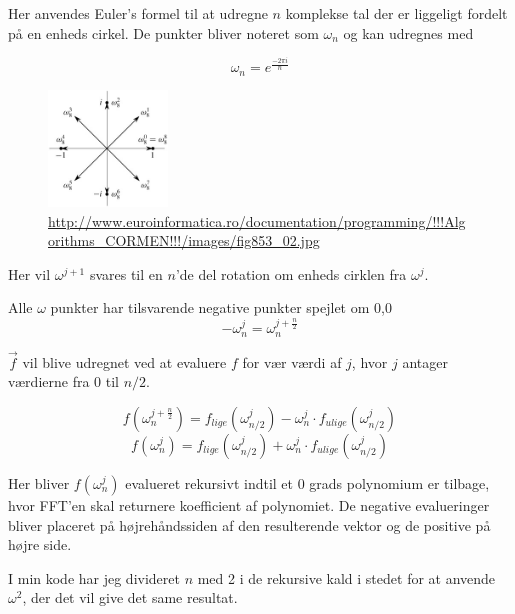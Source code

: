 \documentclass[11pt,a4paper]{article}
\begin{document}
Her anvendes Euler's formel til at udregne \(n\) komplekse tal der er liggeligt fordelt på en enheds cirkel.
De punkter bliver noteret som \(\omega_n\) og kan udregnes med

$$
\omega_n = e^{\frac{-2\pi i}{n}}
$$

\begin{figure}[htbp]
\centering
\includegraphics[width=120]{./nth_root_of_unity.jpg}
\caption{\url{http://www.euroinformatica.ro/documentation/programming/!!!Algorithms\_CORMEN!!!/images/fig853\_02.jpg}}
\end{figure}

Her vil \(\omega^{j+1}\) svares til en \(n\)'de del rotation om enheds cirklen fra \(\omega^j\).

Alle \(\omega\) punkter har tilsvarende negative punkter spejlet om 0,0
$$
-\omega_n^j = \omega_n^{j+\frac{n}{2}}
$$

\bigskip

\(\vec{f}\) vil blive udregnet ved at evaluere \(f\) for vær værdi af \(j\), hvor \(j\) antager værdierne fra 0 til \(n/2\).

$$
f(\omega^{j+\frac{n}{2}}_n) = f_{lige}(\omega^j_{n/2}) - \omega^j_n \cdot f_{ulige}(\omega^j_{n/2})
$$
$$
f(\omega^j_n) = f_{lige}(\omega^j_{n/2}) + \omega^j_n \cdot f_{ulige}(\omega^j_{n/2})
$$

Her bliver \(f(\omega_n^j)\) evalueret rekursivt indtil et 0 grads polynomium er tilbage, hvor FFT'en skal returnere koefficient af polynomiet.
De negative evalueringer bliver placeret på højrehåndssiden af den resulterende vektor og de positive på højre side.

\bigskip

I min kode har jeg divideret \(n\) med 2 i de rekursive kald i stedet for at anvende \(\omega^2\), der det vil give det same resultat.
\end{document}
